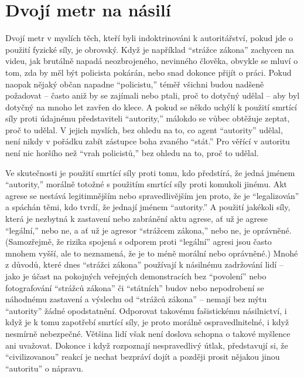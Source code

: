 \documentclass{book}
\begin{document}
\section{Dvojí metr na násilí}

Dvojí metr v myslích těch, kteří byli indoktrinováni k autoritářství, pokud jde o použití fyzické síly, je obrovský. Když je například \enquote{strážce zákona} zachycen na videu, jak brutálně napadá neozbrojeného, nevinného člověka, obvykle se mluví o tom, zda by měl být policista pokárán, nebo snad dokonce přijít o práci. Pokud naopak nějaký občan napadne \enquote{policistu,} téměř všichni budou nadšeně požadovat -- často aniž by se zajímali nebo ptali, proč to dotyčný udělal -- aby byl dotyčný na mnoho let zavřen do klece. A pokud se někdo uchýlí k použití smrtící síly proti údajnému představiteli \enquote{autority,} málokdo se vůbec obtěžuje zeptat, proč to udělal. V jejich myslích, bez ohledu na to, co agent \enquote{autority} udělal, není nikdy v pořádku zabít zástupce boha zvaného \enquote{stát.} Pro věřící v autoritu není nic horšího než \enquote{vrah policistů,} bez ohledu na to, proč to udělal.

Ve skutečnosti je použití smrtící síly proti tomu, kdo předstírá, že jedná jménem \enquote{autority,} morálně totožné s použitím smrtící síly proti komukoli jinému. Akt agrese se nestává legitimnějším nebo spravedlivějším jen proto, že je \enquote{legalizován} a spáchán těmi, kdo tvrdí, že jednají jménem \enquote{autority.} A použití jakékoli síly, která je nezbytná k zastavení nebo zabránění aktu agrese, ať už je agrese \enquote{legální,} nebo ne, a ať už je agresor \enquote{strážcem zákona,} nebo ne, je oprávněné. (Samozřejmě, že rizika spojená s odporem proti \enquote{legální} agresi jsou často mnohem vyšší, ale to neznamená, že je to méně morální nebo oprávněné.) Mnohé z důvodů, které dnes \enquote{strážci zákona} používají k násilnému zadržování lidí -- jako je účast na pokojných veřejných demonstracích bez \enquote{povolení} nebo fotografování \enquote{strážců zákona} či \enquote{státních} budov nebo nepodrobení se náhodnému zastavení a výslechu od \enquote{strážců zákona} -- nemají bez mýtu \enquote{autority} žádné opodstatnění. Odporovat takovému fašistickému násilnictví, i když je k tomu zapotřebí smrtící síly, je proto morálně ospravedlnitelné, i když nesmírně nebezpečné. Většina lidí však není doslova schopna o takové myšlence ani uvažovat. Dokonce i když rozpoznají nespravedlivý útlak, představují si, že \enquote{civilizovanou} reakcí je nechat bezpráví dojít a později prosit nějakou jinou \enquote{autoritu} o nápravu.
\end{document}
